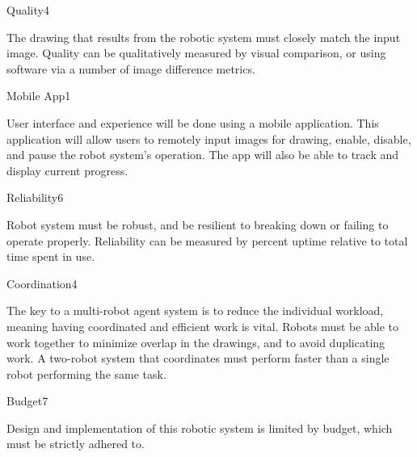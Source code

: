 \begin{nonfunctional_requirement}{Quality}{4}
\item The drawing that results from the robotic system must closely match the input image. Quality can be qualitatively measured by visual comparison, or using software via a number of image difference metrics.
\end{nonfunctional_requirement}

\begin{nonfunctional_requirement}{Mobile App}{1}
\item User interface and experience will be done using a mobile application. This application will allow users to remotely input images for drawing, enable, disable, and pause the robot system's operation. The app will also be able to track and display current progress.
\end{nonfunctional_requirement}

\begin{nonfunctional_requirement}{Reliability}{6}
\item Robot system must be robust, and be resilient to breaking down or failing to operate properly. Reliability can be measured by percent uptime relative to total time spent in use.
\end{nonfunctional_requirement}


\begin{nonfunctional_requirement}{Coordination}{4}
\item The key to a multi-robot agent system is to reduce the individual workload, meaning having coordinated and efficient work is vital. Robots must be able to work together to minimize overlap in the drawings, and to avoid duplicating work. A two-robot system that coordinates must perform faster than a single robot performing the same task.
\end{nonfunctional_requirement}

\begin{nonfunctional_requirement}{Budget}{7}
\label{nfr:budget}
\item Design and implementation of this robotic system is limited by budget, which must be strictly adhered to. 
\end{nonfunctional_requirement}


